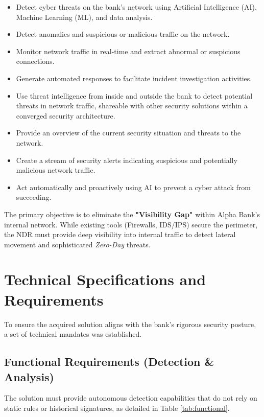 \documentclass[12pt,a4paper]{report}
\begin{document}
\begin{itemize}
  \item Detect cyber threats on the bank's network using Artificial Intelligence (AI),
    Machine Learning (ML), and data analysis.
  \item Detect anomalies and suspicious or malicious traffic on the network.
  \item Monitor network traffic in real-time and extract abnormal or suspicious connections.
  \item Generate automated responses to facilitate incident investigation activities.
  \item Use threat intelligence from inside and outside the bank to detect potential threats
    in network traffic, shareable with other security solutions within a converged security
    architecture.
  \item Provide an overview of the current security situation and threats to the network.
  \item Create a stream of security alerts indicating suspicious and potentially malicious
    network traffic.
  \item Act automatically and proactively using AI to prevent a cyber attack from
    succeeding.
\end{itemize}

The primary objective is to eliminate the \textbf{"Visibility Gap"} within Alpha Bank's
internal network. While existing tools (Firewalls, IDS/IPS) secure the perimeter, the NDR
must provide deep visibility into internal traffic to detect lateral movement and sophisticated
\textit{Zero-Day} threats.

\section{Technical Specifications and Requirements}
To ensure the acquired solution aligns with the bank's rigorous security posture, a set of technical mandates was established.

\subsection{Functional Requirements (Detection \& Analysis)}

The solution must provide autonomous detection capabilities that do not rely on static rules
or historical signatures, as detailed in Table \ref{tab:functional}.
\end{document}
